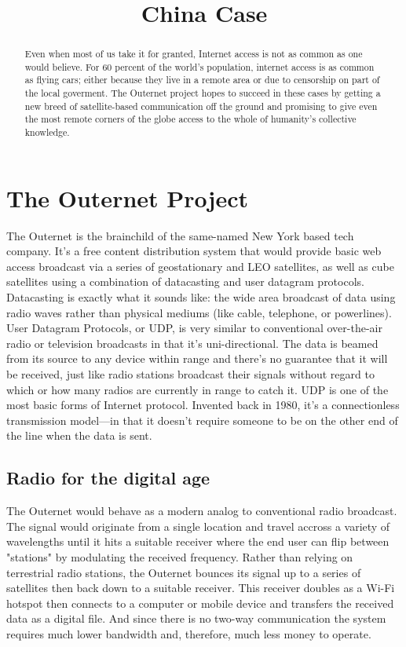\documentclass[10pt,conference,a4paper]{IEEEtran}%
\title{China Case}
\author{%
\IEEEauthorblockN{Zamora, Sa\'ul}
\IEEEauthorblockA{aleks279@gmail.com}
\IEEEauthorblockA{200835773}

\IEEEauthorblockN{Rojas, Allan}
\IEEEauthorblockA{aallanrd@gmail.com}
\IEEEauthorblockA{200941386}
}
\begin{document}
\maketitle

\begin{abstract}
  Even when most of us take it for granted, Internet access is not as common as one would believe. For 60 percent of the world's population, internet access is as common as flying cars; either because they live in a remote area or due to censorship on part of the local goverment.
  The Outernet project hopes to succeed in these cases by getting a new breed of satellite-based communication off the ground and promising to give even the most remote corners of the globe access to the whole of humanity's collective knowledge.
\end{abstract}

\section{The Outernet Project}
The Outernet is the brainchild of the same-named New York based tech company. It's a free content distribution system that would provide basic web access broadcast via a series of geostationary and LEO satellites, as well as cube satellites using a combination of datacasting and user datagram protocols.
Datacasting is exactly what it sounds like: the wide area broadcast of data using radio waves rather than physical mediums (like cable, telephone, or powerlines). User Datagram Protocols, or UDP, is very similar to conventional over-the-air radio or television broadcasts in that it's uni-directional. The data is beamed from its source to any device within range and there's no guarantee that it will be received, just like radio stations broadcast their signals without regard to which or how many radios are currently in range to catch it.
UDP is one of the most basic forms of Internet protocol. Invented back in 1980, it's a connectionless transmission model—in that it doesn't require someone to be on the other end of the line when the data is sent.

\subsection{Radio for the digital age}
The Outernet would behave as a modern analog to conventional radio broadcast. The signal would originate from a single location and travel accross a variety of wavelengths until it hits a suitable receiver where the end user can flip between "stations" by modulating the received frequency.
Rather than relying on terrestrial radio stations, the Outernet bounces its signal up to a series of satellites then back down to a suitable receiver. This receiver doubles as a Wi-Fi hotspot then connects to a computer or mobile device and transfers the received data as a digital file. And since there is no two-way communication the system requires much lower bandwidth and, therefore, much less money to operate.
\end{document}
